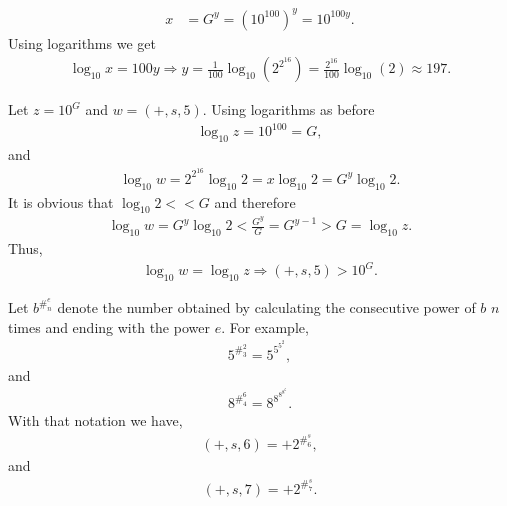 \begin{questions}
\begin{solution}
\begin{align*}
x&=G^y=\left(10^{100}\right)^y=10^{100y}.
\end{align*}
Using logarithms we get
\begin{align*}
\log_{10}x=100y\Rightarrow
y=\frac{1}{100}\log_{10}\left(2^{2^{16}}\right)=\frac{2^{16}}{100}\log_{10}\left(2\right)\approx
197.
\end{align*}
\end{solution}
\begin{solution}
Let $z=10^G$ and $w=(+,s,5)$. Using logarithms as before
\begin{align*}
\log_{10}z=10^{100}=G,
\end{align*}
and
\begin{align*}
\log_{10}w=2^{2^{16}}\log_{10}2=x\log_{10}2=G^y\log_{10}2.
\end{align*}
It is obvious that $\log_{10}2<<G$ and therefore
\begin{align*}
\log_{10}w=G^y\log_{10}2<\frac{G^y}{G}=G^{y-1}>G=\log_{10}z.
\end{align*}
Thus,
\begin{align*}
\log_{10}w=\log_{10}z\Rightarrow (+,s,5)>10^G.
\end{align*}
\end{solution}
\newpage
{}
\begin{solution}
Let $b^{\#_n^e}$ denote the number obtained by calculating the consecutive power of $b$ $n$ times and ending with the power $e$. For example,
\begin{align*}
5^{\#_3^2}=5^{5^{5^2}},
\end{align*}
and
\begin{align*}
8^{\#_4^6}=8^{8^{8^{8^6}}}.
\end{align*}
With that notation we have,
\begin{align*}
(+, s, 6)= +2^{\#_6^s},
\end{align*}
and
\begin{align*}
(+, s, 7)= +2^{\#_7^s}.
\end{align*}
\end{solution}
\end{questions}
